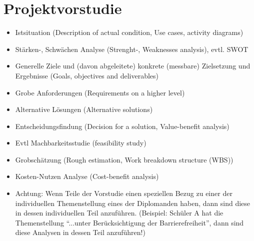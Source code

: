 \chapter{Projektvorstudie}

\begin{itemize}
\item Istsituation (Description of actual condition, Use cases, activity diagrams)
\item Stärken-, Schwächen Analyse (Strenght-, Weaknesses analysis), evtl. SWOT
\item Generelle Ziele und (davon abgeleitete) konkrete (messbare) Zielsetzung und Ergebnisse (Goals, objectives and deliverables)
\item Grobe Anforderungen (Requirements on a higher level)
\item Alternative Lösungen (Alternative solutions)
\item Entscheidungsfindung (Decision for a solution, Value-benefit analysis)
\item Evtl Machbarkeitsstudie (feasibility study)
\item Grobschätzung (Rough estimation, Work breakdown structure (WBS))
\item Kosten-Nutzen Analyse (Cost-benefit analysis)
\item Achtung: Wenn Teile der Vorstudie einen speziellen Bezug zu einer der individuellen Themenstellung eines der Diplomanden haben, dann sind diese in dessen individuellen Teil anzuführen. (Beispiel: Schüler A hat die Themenstellung “...unter Berücksichtigung der Barrierefreiheit”, dann sind diese Analysen in dessen Teil anzuführen!)

\end{itemize}
